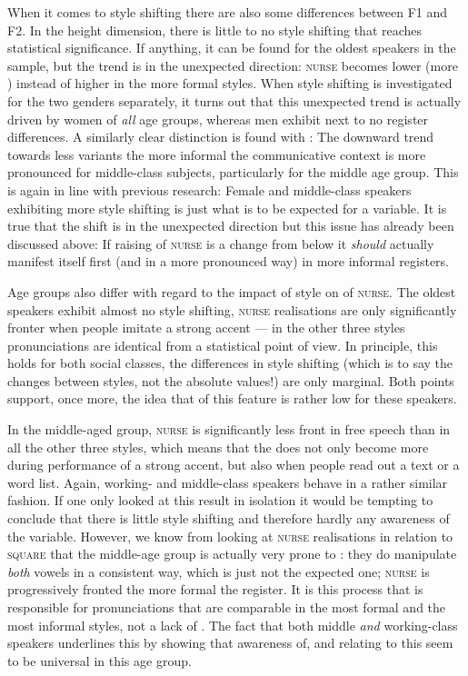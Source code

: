When it comes to style shifting there are also some differences between F1 and F2.
In the height dimension, there is little to no style shifting that reaches statistical significance.
If anything, it can be found for the oldest speakers in the sample, but the trend is in the unexpected direction: \textsc{nurse} becomes lower (more ) instead of higher in the more formal styles.
When style shifting is investigated for the two genders separately, it turns out that this unexpected trend is actually driven by women of \emph{all} age groups, whereas men exhibit next to no register differences.
A similarly clear distinction is found with : The downward trend towards less  variants the more informal the communicative context is more pronounced for middle-class subjects, particularly for the middle age group.
This is again in line with previous research: Female and middle-class speakers exhibiting more style shifting is just what is to be expected for a  variable.
It is true that the shift is in the unexpected direction but this issue has already been discussed above: If raising of \textsc{nurse} is a change from below it \emph{should} actually manifest itself first (and in a more pronounced way) in more informal registers.

Age groups also differ with regard to the impact of style on  of \textsc{nurse}.
The oldest speakers exhibit almost no style shifting, \textsc{nurse} realisations are only significantly fronter when people imitate a strong  accent --- in the other three styles pronunciations are identical from a statistical point of view.
In principle, this holds for both social classes, the differences in style shifting (which is to say the changes between styles, not the absolute values!) are only marginal.
Both points support, once more, the idea that  of this feature is rather low for these speakers.

In the middle-aged group, \textsc{nurse} is significantly less front in free speech than in all the other three styles, which means that the  does not only become more  during performance of a strong accent, but also when people read out a text or a word list.
Again, working- and middle-class speakers behave in a rather similar fashion.
If one only looked at this result in isolation it would be tempting to conclude that there is little style shifting and therefore hardly any awareness of the variable.
However, we know from looking at \textsc{nurse} realisations in relation to \textsc{square} that the middle-age group is actually very prone to : they do manipulate \emph{both} vowels in a consistent way, which is just not the expected one; \textsc{nurse} is progressively fronted the more formal the register.
It is this process that is responsible for pronunciations that are comparable in the most formal and the most informal styles, not a lack of .
The fact that both middle \emph{and} working-class speakers  underlines this by showing that awareness of, and  relating to this  seem to be universal in this age group.

